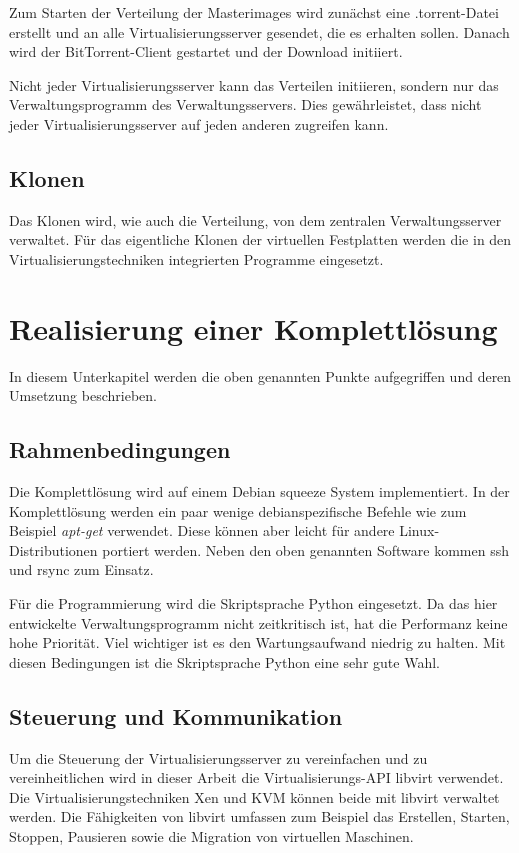 Zum Starten der Verteilung der Masterimages wird zunächst eine .torrent-Datei erstellt und an alle Virtualisierungsserver gesendet, die es erhalten sollen. Danach wird der BitTorrent-Client gestartet und der Download initiiert.

Nicht jeder Virtualisierungsserver kann das Verteilen initiieren, sondern nur das Verwaltungsprogramm des Verwaltungsservers. Dies gewährleistet, dass nicht jeder Virtualisierungsserver auf jeden anderen zugreifen kann.

\subsection{Klonen}
Das Klonen wird, wie auch die Verteilung, von dem zentralen Verwaltungsserver verwaltet. Für das eigentliche Klonen der virtuellen Festplatten werden die in den Virtualisierungstechniken integrierten Programme eingesetzt. 

\section{Realisierung einer Komplettlösung}
In diesem Unterkapitel werden die oben genannten Punkte aufgegriffen und deren Umsetzung beschrieben.
\subsection{Rahmenbedingungen}
Die Komplettlösung wird auf einem Debian squeeze System implementiert. In der Komplettlösung werden ein paar wenige debianspezifische Befehle wie zum Beispiel \textit{apt-get} verwendet. Diese können aber leicht für andere Linux-Distributionen portiert werden. Neben den oben genannten Software kommen ssh und rsync zum Einsatz.

Für die Programmierung wird die Skriptsprache Python eingesetzt. Da das hier entwickelte Verwaltungsprogramm nicht zeitkritisch ist, hat die Performanz keine hohe Priorität. Viel wichtiger ist es den Wartungsaufwand niedrig zu halten. Mit diesen Bedingungen ist die Skriptsprache Python eine sehr gute Wahl.

\subsection{Steuerung und Kommunikation}
Um die Steuerung der Virtualisierungsserver zu vereinfachen und zu vereinheitlichen wird in dieser Arbeit die Virtualisierungs-API libvirt verwendet. Die Virtualisierungstechniken Xen und KVM können beide mit libvirt verwaltet werden. Die Fähigkeiten von libvirt umfassen zum Beispiel das Erstellen, Starten, Stoppen, Pausieren sowie die Migration von virtuellen Maschinen. 

